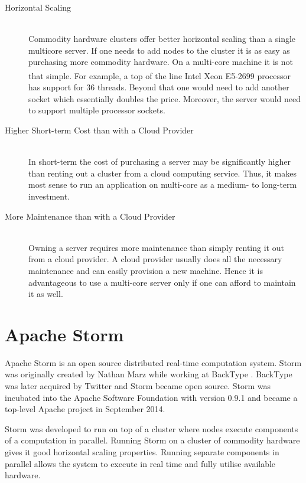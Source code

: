 \begin{description}
	\item[Horizontal Scaling] \hfill \\
	Commodity hardware clusters offer better horizontal scaling than a single multicore server. If one needs to add nodes to the cluster it is as easy as purchasing more commodity hardware. On a multi-core machine it is not that simple. For example, a top of the line Intel\textsuperscript{\textregistered} Xeon\textsuperscript{\textregistered} E5-2699 processor has support for 36 threads. Beyond that one would need to add another socket which essentially doubles the price. Moreover, the server would need to support multiple processor sockets.
	\item[Higher Short-term Cost than with a Cloud Provider] \hfill \\
	In short-term the cost of purchasing a server may be significantly higher than renting out a cluster from a cloud computing service. Thus, it makes most sense to run an application on multi-core as a medium- to long-term investment.
	\item[More Maintenance than with a Cloud Provider] \hfill \\
	Owning a server requires more maintenance than simply renting it out from a cloud provider. A cloud provider usually does  all the necessary maintenance and can easily provision a new machine. Hence it is advantageous to use a multi-core server only if one can afford to maintain it as well.
\end{description}

\section{Apache Storm}
\label{sec:apache_storm}

Apache Storm is an open source distributed real-time computation system. Storm was originally created by Nathan Marz while working at BackType \cite{NathanAbout}. BackType was later acquired by Twitter and Storm became open source. Storm was incubated into the Apache Software Foundation with version 0.9.1 and became a top-level Apache project in September 2014.

Storm was developed to run on top of a cluster where nodes execute components of a computation in parallel. Running Storm on a cluster of commodity hardware gives it good horizontal scaling properties. Running separate components in parallel allows the system to execute in real time and fully utilise available hardware.

